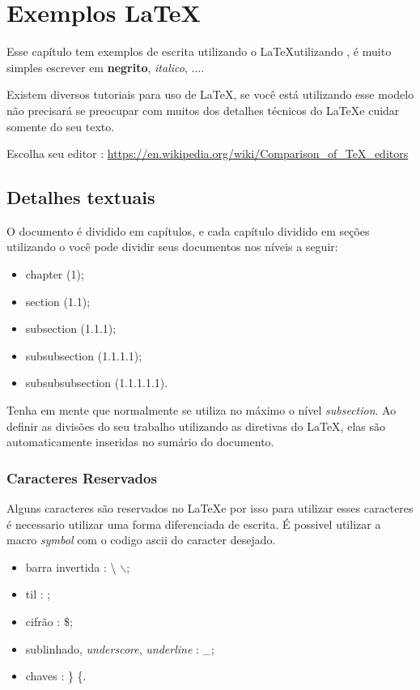 \chapter{Exemplos \LaTeX}



Esse capítulo tem exemplos de escrita utilizando o \LaTeX  utilizando \abnTeX, é muito simples escrever em \textbf{negrito}, \emph{italico}, ....


Existem diversos tutoriais para uso de \LaTeX, se você está utilizando esse modelo não precisará se preocupar com muitos dos detalhes técnicos do \LaTeX \space e cuidar somente do seu texto.

Escolha seu editor : \url{https://en.wikipedia.org/wiki/Comparison\_of\_TeX\_editors}




\section{Detalhes textuais}

O documento é dividido em capítulos, e cada capítulo dividido em seções utilizando o \abnTeX \space você pode dividir seus documentos nos níveis a seguir:

\begin{itemize}
\item chapter (1);
\item section (1.1);
\item subsection (1.1.1);
\item subsubsection (1.1.1.1);
\item subsubsubsection (1.1.1.1.1).
\end{itemize}

Tenha em mente que normalmente se utiliza no máximo o nível \emph{subsection}.
Ao definir as divisões do seu trabalho utilizando as diretivas do \LaTeX, elas são automaticamente inseridas no sumário do documento.


\subsection{Caracteres Reservados}



Alguns caracteres são reservados no \LaTeX \space e por isso para utilizar esses caracteres é necessario utilizar uma forma diferenciada de escrita. É possivel utilizar a macro \emph{symbol} com o codigo ascii do caracter desejado.
\begin{itemize}
\item barra invertida : \textbackslash   {}    $\backslash$;
\item til  :   ;
\item cifrão : \$;
\item sublinhado, \emph{underscore}, \emph{underline} : \_;
\item chaves : \} \{.
\end{itemize}

